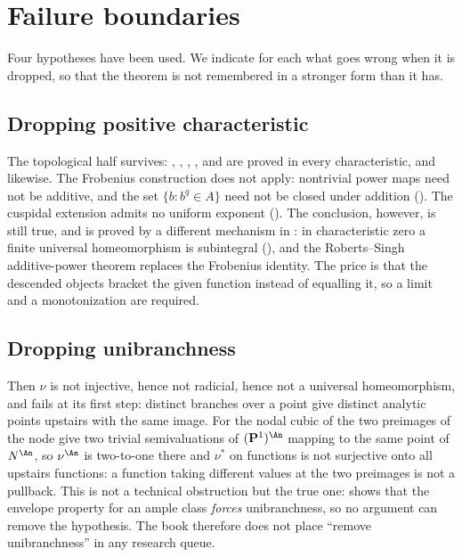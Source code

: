 \section{Failure boundaries}
\label{sec:ch43-failure}

Four hypotheses have been used.  We indicate for each what goes wrong when
it is dropped, so that the theorem is not remembered in a stronger form than
it has.

\subsection{Dropping positive characteristic}
\label{sec:ch43-failure-char}

The topological half survives:
,
, ,
,
 and
 are proved in every
characteristic, and  likewise.
The Frobenius construction does not apply: nontrivial power maps
need not be additive, and the set $\{b:b^q\in A\}$ need not be
closed under addition ().
The cuspidal extension admits no uniform exponent
().  The conclusion,
however, is still true, and is proved by a different mechanism in
: in characteristic zero a finite
universal homeomorphism is subintegral
(), and the Roberts--Singh additive-power
theorem  replaces the Frobenius identity.  The
price is that the descended objects bracket the given function instead of
equalling it, so a limit and a monotonization are required.

\subsection{Dropping unibranchness}
\label{sec:ch43-failure-unibranch}

Then $\nu$ is not injective, hence not radicial, hence not a universal
homeomorphism, and  fails at
its first step: distinct branches over a point give distinct analytic points
upstairs with the same image.  For the nodal cubic of
 the two preimages of the node give two
trivial semivaluations of $(\mathbf P^1)^{\An}$ mapping to the same point
of $N^{\An}$, so $\nu^{\An}$ is two-to-one there and $\nu^*$ on
functions is not surjective onto all upstairs functions: a function
taking different values at the two preimages is not a pullback.  This is not a
technical obstruction but the true one:
 shows that the envelope property for an
ample class \emph{forces} unibranchness, so no argument can remove the
hypothesis.  The book therefore does not place ``remove unibranchness'' in
any research queue.

